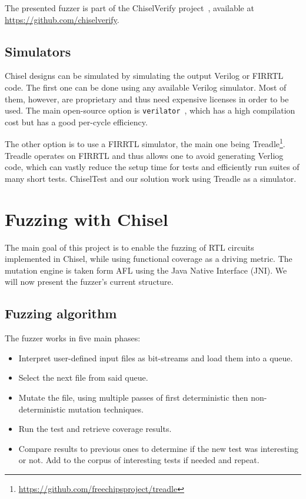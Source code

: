 \documentclass[conference]{IEEEtran}
\newcommand{\todo}[1]{{\color{olive} TODO: #1}}
\begin{document}
The presented fuzzer is part of the ChiselVerify project~\cite{verify:chisel:2020, dobis2021opensource}, available
at \url{https://github.com/chiselverify}.

\subsection{Simulators}

Chisel designs can be simulated by simulating the output Verilog or FIRRTL code.
The first one can be done using any available Verilog simulator.
Most of them, however, are proprietary and thus need expensive licenses in order to be used. 
The main open-source option is \texttt{verilator}~\cite{verilator}, which has a high compilation cost but has a good per-cycle efficiency.

The other option is to use a FIRRTL simulator, the main one being Treadle\footnote{\url{https://github.com/freechipsproject/treadle}}.
Treadle operates on FIRRTL and thus allows one to avoid generating Verliog code, which can vastly reduce the setup time for tests and efficiently run suites of many short tests.
ChiselTest and our solution work using Treadle as a simulator. 


\section{Fuzzing with Chisel}
The main goal of this project is to enable the fuzzing of RTL circuits implemented in Chisel, while using functional coverage as a driving metric.
The mutation engine is taken form AFL using the Java Native Interface (JNI).
We will now present the fuzzer's current structure.

\subsection{Fuzzing algorithm}  
The fuzzer works in five main phases:  
\begin{itemize}
\item Interpret user-defined input files as bit-streams and load them into a queue.
\item Select the next file from said queue.
\item Mutate the file, using multiple passes of first deterministic then non-deterministic mutation techniques.  
\item Run the test and retrieve coverage results. 
\item Compare results to previous ones to determine if the new test was interesting or not. Add to the corpus of interesting tests if needed and repeat. 
\end{itemize}  
\end{document}

